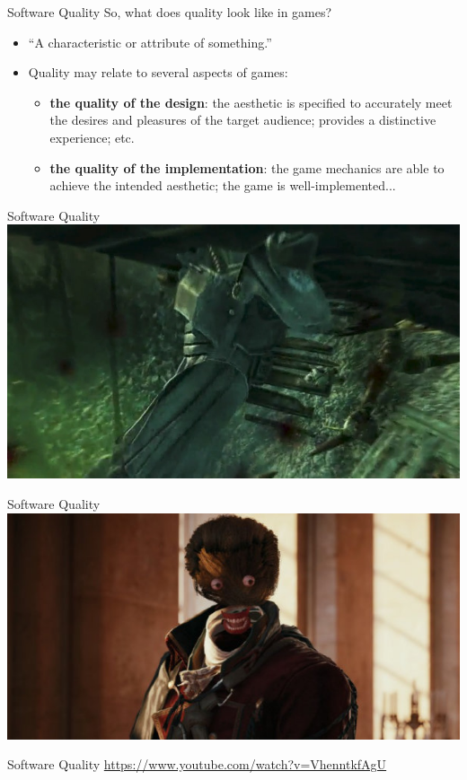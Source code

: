\begin{frame}[fragile]{Software Quality}
	So, what does quality look like in games?
	
	\begin{itemize}
		\item ``A characteristic or attribute of something.''
		\item Quality may relate to several aspects of games:
		\begin{itemize}
			\item \textbf{the quality of the design}: the aesthetic is specified to accurately meet the desires and 
			pleasures of the target audience; provides a distinctive experience; etc.
			\item \textbf{the quality of the implementation}: the game mechanics are able to achieve the intended
			aesthetic; the game is well-implemented...
		\end{itemize}
	\end{itemize}
\end{frame}

\begin{frame}[fragile]{Software Quality}
	\includegraphics[height=16ex]{fallout3_collision_bugs.jpg}
\end{frame}

\begin{frame}[fragile]{Software Quality}
	\includegraphics[height=16ex]{ac_graphics_bug.jpg}
\end{frame}

\begin{frame}[fragile]{Software Quality}
	\url{https://www.youtube.com/watch?v=VhenntkfAgU}
\end{frame}

